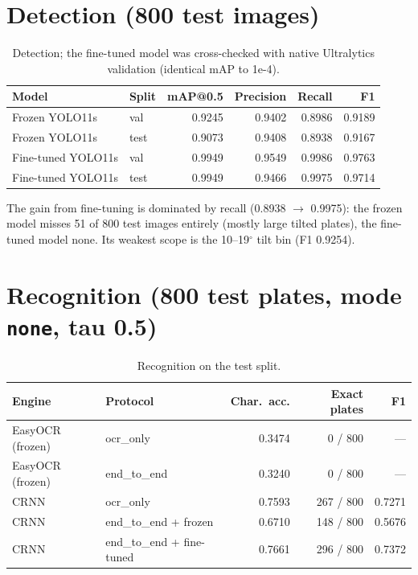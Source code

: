 \documentclass[11pt]{article}
\begin{document}
\section{Detection (800 test images)}

\begin{table}[H]
\centering
\small
\begin{tabular}{@{}llrrrr@{}}
\toprule
Model & Split & mAP@0.5 & Precision & Recall & F1 \\
\midrule
Frozen YOLO11s & val & 0.9245 & 0.9402 & 0.8986 & 0.9189 \\
Frozen YOLO11s & test & 0.9073 & 0.9408 & 0.8938 & 0.9167 \\
Fine-tuned YOLO11s & val & 0.9949 & 0.9549 & 0.9986 & 0.9763 \\
Fine-tuned YOLO11s & test & 0.9949 & 0.9466 & 0.9975 & 0.9714 \\
\bottomrule
\end{tabular}
\caption{Detection; the fine-tuned model was cross-checked with native
Ultralytics validation (identical mAP to 1e-4).}
\end{table}

The gain from fine-tuning is dominated by recall
(0.8938 $\rightarrow$ 0.9975): the frozen model misses 51 of 800 test
images entirely (mostly large tilted plates), the fine-tuned model none.
Its weakest scope is the 10--19$^{\circ}$ tilt bin (F1 0.9254).

\section{Recognition (800 test plates, mode \texttt{none}, tau 0.5)}

\begin{table}[H]
\centering
\small
\begin{tabular}{@{}llrrr@{}}
\toprule
Engine & Protocol & Char.\ acc. & Exact plates & F1 \\
\midrule
EasyOCR (frozen) & ocr\_only & 0.3474 & 0 / 800 & --- \\
EasyOCR (frozen) & end\_to\_end & 0.3240 & 0 / 800 & --- \\
CRNN & ocr\_only & 0.7593 & 267 / 800 & 0.7271 \\
CRNN & end\_to\_end + frozen & 0.6710 & 148 / 800 & 0.5676 \\
CRNN & end\_to\_end + fine-tuned & 0.7661 & 296 / 800 & 0.7372 \\
\bottomrule
\end{tabular}
\caption{Recognition on the test split.}
\end{table}
\end{document}
